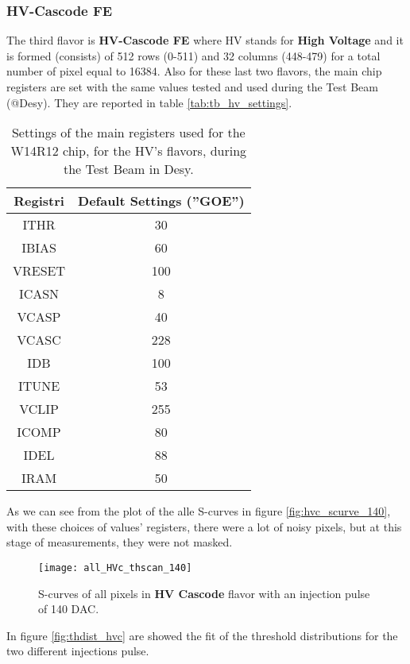 \subsubsection{HV-Cascode FE}

The third flavor is \textbf{HV-Cascode FE} where HV stands for \textbf{High Voltage} and it is formed (consists) of 512 rows (0-511) and 32 columns (448-479) for a total number of pixel equal to 16384. Also for these last two flavors, the main chip registers are set with the same values tested and used during the Test Beam (@Desy). They are reported in table \vref{tab:tb_hv_settings}.

\begin{table}[h!]
\centering
\begin{tabular}{c|c}
Registri & Default Settings (''GOE'') \\
\hline
ITHR & 30 \\
\hline
IBIAS & 60 \\
\hline
VRESET & 100 \\
\hline
ICASN & 8 \\
\hline
VCASP & 40 \\
\hline
VCASC & 228 \\
\hline
IDB & 100 \\
\hline
ITUNE & 53 \\
\hline
VCLIP & 255 \\
\hline
ICOMP & 80 \\
\hline
IDEL & 88 \\
\hline
IRAM & 50 \\
\hline
\end{tabular}
\caption{Settings of the main registers used for the W14R12 chip, for the HV's flavors, during the Test Beam in Desy.}
\label{tab:tb_hv_settings}
\end{table}

As we can see from the plot of the alle S-curves in figure \vref{fig:hvc_scurve_140}, with these choices of values' registers, there were a lot of noisy pixels, but at this stage of measurements, they were not masked.

\begin{figure}[h!]
\centering
\texttt{[image: all\_HVc\_thscan\_140]}
\caption{S-curves of all pixels in \textbf{HV Cascode} flavor with an injection pulse of 140 DAC.}
\label{fig:hvc_scurve_140}
\end{figure}

In figure \vref{fig:thdist_hvc} are showed the fit of the threshold distributions for the two different injections pulse.

